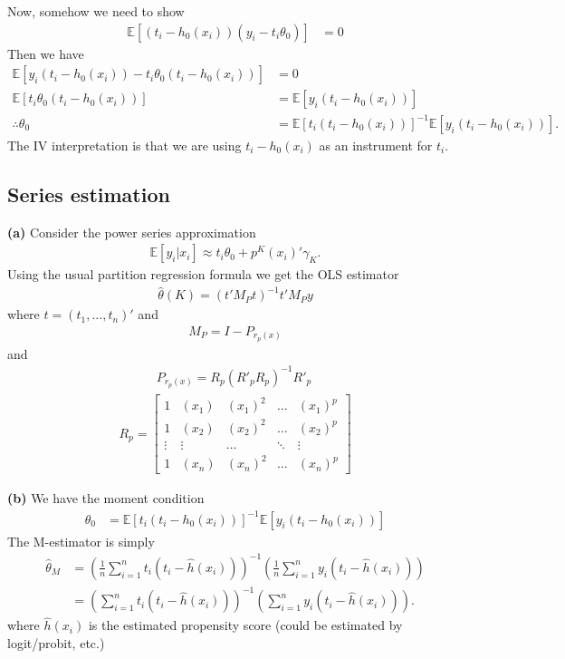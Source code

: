 \documentclass[12pt]{article}
\newcommand{\E}{\mathbb{E}}
\newcommand{\mtx}[1]{\ensuremath{\bm{\mathit{#1}}}}
\begin{document}
Now, somehow we need to show
\begin{align*}
\E[(t_i-h_0(\mtx{x}_i))(y_i - t_i\theta_0)]&=0
\end{align*}
Then we have
\begin{align*}
\E[y_i (t_i-h_0(\mtx{x}_i))- t_i\theta_0(t_i-h_0(\mtx{x}_i))]&=0\\
\E[t_i\theta_0(t_i-h_0(\mtx{x}_i))] &= \E[y_i (t_i-h_0(\mtx{x}_i))]\\
\therefore \theta_0 &= \E[t_i(t_i-h_0(\mtx{x}_i))]^{-1}\E[y_i (t_i-h_0(\mtx{x}_i))].
\end{align*}
The IV interpretation is that we are using $t_i-h_0(\mtx{x}_i)$ as an instrument for $t_i$.

\subsection{Series estimation}
\textbf{(a)} Consider the power series approximation
\begin{align*}
\E[y_i |\mtx{x}_i] \approx t_i \theta_0 + \mtx{p}^K(\mtx{x}_i)'\mtx{\gamma}_K.
\end{align*}
Using the usual partition regression formula we get the OLS estimator
\begin{align*}
\hat \theta(K) = (\mtx{t}'\mtx{M}_{P}\mtx{t})^{-1}\mtx{t}'\mtx{M}_P\mtx{y}
\end{align*}
where $\mtx{t} = (t_1, ...,t_n)'$ and 
\begin{align*}
\mtx{M}_P = \mtx{I} - \mtx{P}_{r_p(x)}
\end{align*}
and
\begin{align*}
\mtx{P}_{r_p(x)} =\mtx{R}_p \left(\mtx{R}'_p \mtx{R}_p \right)^{-1} \mtx{R}'_p \
\end{align*}
\begin{align*}
\mtx{R}_p = 
\begin{bmatrix}
1 & (\mtx{x}_1) & (\mtx{x}_1)^2 & \dots& (\mtx{x}_1)^p \\
1 & (\mtx{x}_2) & (\mtx{x}_2)^2 & \dots& (\mtx{x}_2)^p\\
\vdots & \vdots & \dots & \ddots & \vdots \\
1 & (\mtx{x}_n) & (\mtx{x}_n)^2 & \dots& (\mtx{x}_n)^p
\end{bmatrix}
\end{align*}

\textbf{(b)}
We have the moment condition
\begin{align*}
\theta_0 &= \E[t_i(t_i-h_0(\mtx{x}_i))]^{-1}\E[y_i (t_i-h_0(\mtx{x}_i))]
\end{align*}
The M-estimator is simply
\begin{align*}
\hat \theta_M &=\left(\frac{1}{n}\sum_{i=1}^nt_i(t_i-\hat h(\mtx{x}_i))\right)^{-1} \left(\frac{1}{n}\sum_{i=1}^n y_i (t_i-\hat h(\mtx{x}_i))\right)\\
&=\left(\sum_{i=1}^nt_i(t_i- \hat h(\mtx{x}_i))\right)^{-1} \left(\sum_{i=1}^n y_i (t_i- \hat h(\mtx{x}_i))\right).
\end{align*}
where $\hat h(\mtx{x}_i)$ is the estimated propensity score (could be estimated by logit/probit, etc.)
\end{document}
